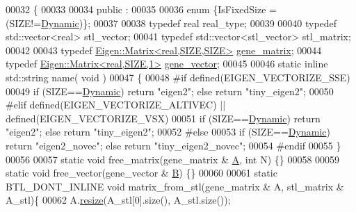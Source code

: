 \begin{DoxyCode}
00032 \{
00033 
00034 public :
00035 
00036   \textcolor{keyword}{enum} \{IsFixedSize = (SIZE!=\hyperlink{namespace_eigen_ad81fa7195215a0ce30017dfac309f0b2}{Dynamic})\};
00037 
00038   \textcolor{keyword}{typedef} real real\_type;
00039 
00040   \textcolor{keyword}{typedef} std::vector<real> stl\_vector;
00041   \textcolor{keyword}{typedef} std::vector<stl\_vector> stl\_matrix;
00042 
00043   \textcolor{keyword}{typedef} \hyperlink{group___core___module_class_eigen_1_1_matrix}{Eigen::Matrix<real,SIZE,SIZE>} \hyperlink{group___core___module_class_eigen_1_1_matrix}{gene\_matrix};
00044   \textcolor{keyword}{typedef} \hyperlink{group___core___module_class_eigen_1_1_matrix}{Eigen::Matrix<real,SIZE,1>} \hyperlink{group___core___module_class_eigen_1_1_matrix}{gene\_vector};
00045 
00046   \textcolor{keyword}{static} \textcolor{keyword}{inline} std::string name( \textcolor{keywordtype}{void} )
00047   \{
00048 \textcolor{preprocessor}{    #if defined(EIGEN\_VECTORIZE\_SSE)}
00049     \textcolor{keywordflow}{if} (SIZE==\hyperlink{namespace_eigen_ad81fa7195215a0ce30017dfac309f0b2}{Dynamic}) \textcolor{keywordflow}{return} \textcolor{stringliteral}{"eigen2"}; \textcolor{keywordflow}{else} \textcolor{keywordflow}{return} \textcolor{stringliteral}{"tiny\_eigen2"};
00050 \textcolor{preprocessor}{    #elif defined(EIGEN\_VECTORIZE\_ALTIVEC) || defined(EIGEN\_VECTORIZE\_VSX)}
00051     \textcolor{keywordflow}{if} (SIZE==\hyperlink{namespace_eigen_ad81fa7195215a0ce30017dfac309f0b2}{Dynamic}) \textcolor{keywordflow}{return} \textcolor{stringliteral}{"eigen2"}; \textcolor{keywordflow}{else} \textcolor{keywordflow}{return} \textcolor{stringliteral}{"tiny\_eigen2"};
00052 \textcolor{preprocessor}{    #else}
00053     \textcolor{keywordflow}{if} (SIZE==\hyperlink{namespace_eigen_ad81fa7195215a0ce30017dfac309f0b2}{Dynamic}) \textcolor{keywordflow}{return} \textcolor{stringliteral}{"eigen2\_novec"}; \textcolor{keywordflow}{else} \textcolor{keywordflow}{return} \textcolor{stringliteral}{"tiny\_eigen2\_novec"};
00054 \textcolor{preprocessor}{    #endif}
00055   \}
00056 
00057   \textcolor{keyword}{static} \textcolor{keywordtype}{void} free\_matrix(gene\_matrix & \hyperlink{group___core___module_class_eigen_1_1_matrix}{A}, \textcolor{keywordtype}{int} N) \{\}
00058 
00059   \textcolor{keyword}{static} \textcolor{keywordtype}{void} free\_vector(gene\_vector & \hyperlink{group___core___module_class_eigen_1_1_matrix}{B}) \{\}
00060 
00061   \textcolor{keyword}{static} BTL\_DONT\_INLINE \textcolor{keywordtype}{void} matrix\_from\_stl(gene\_matrix & A, stl\_matrix & A\_stl)\{
00062     A.\hyperlink{class_eigen_1_1_plain_object_base_a99d9054ee2d5a40c6e00ded0265e9cea}{resize}(A\_stl[0].size(), A\_stl.size());

\end{DoxyCode}

